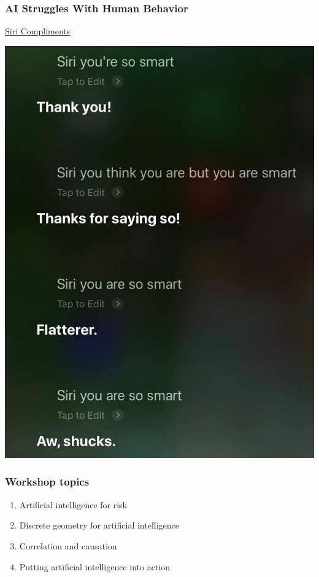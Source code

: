 \begin{frame}
\frametitle{AI Struggles With Human Behavior}
\href{run:figures/siri_smart_sarcasm.m4a}{Siri Compliments}

\begin{center}
\includegraphics[height=0.7\textheight]{figures/siri_transcript}
\end{center}
\end{frame}

\begin{frame}
\frametitle{Workshop topics}
\begin{enumerate}
\item Artificial intelligence for risk
\item Discrete geometry for artificial intelligence
\item Correlation and causation
\item Putting artificial intelligence into action
\end{enumerate}
\end{frame}

